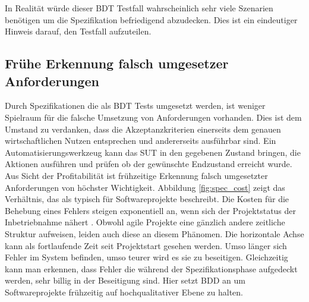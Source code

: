 In Realität würde dieser \Gls{BDT} Testfall wahrscheinlich sehr viele Szenarien benötigen um die Spezifikation befriedigend abzudecken. Dies ist ein eindeutiger Hinweis darauf, den Testfall aufzuteilen.

\subsection{Frühe Erkennung falsch umgesetzer Anforderungen}
Durch Spezifikationen die als \Gls{BDT} Tests umgesetzt werden, ist weniger Spielraum für die falsche Umsetzung von Anforderungen vorhanden. Dies ist dem Umstand zu verdanken, dass die Akzeptanzkriterien einerseits dem genauen wirtschaftlichen Nutzen entsprechen und andererseits ausführbar sind. Ein Automatisierungswerkzeug kann das \Gls{SUT} in den gegebenen Zustand bringen, die Aktionen ausführen und prüfen ob der gewünschte Endzustand erreicht wurde.\\
Aus Sicht der Profitabilität ist frühzeitige Erkennung falsch umgesetzter Anforderungen von höchster Wichtigkeit. Abbildung \ref{fig:spec_cost} zeigt das Verhältnis, das \citeauthor{boehm_software_1981} als typisch für Softwareprojekte beschreibt. Die Kosten für die Behebung eines Fehlers steigen exponentiell an, wenn sich der Projektstatus der Inbetriebnahme nähert \cite{boehm_software_1981}. Obwohl agile Projekte eine gänzlich andere zeitliche Struktur aufweisen, leiden auch diese an diesem Phänomen. Die horizontale Achse kann als fortlaufende Zeit seit Projektstart gesehen werden. Umso länger sich Fehler im System befinden, umso teurer wird es sie zu beseitigen. Gleichzeitig kann man erkennen, dass Fehler die während der Spezifikationsphase aufgedeckt werden, sehr billig in der Beseitigung sind. Hier setzt \Gls{BDD} an um Softwareprojekte frühzeitig auf hochqualitativer Ebene zu halten.

